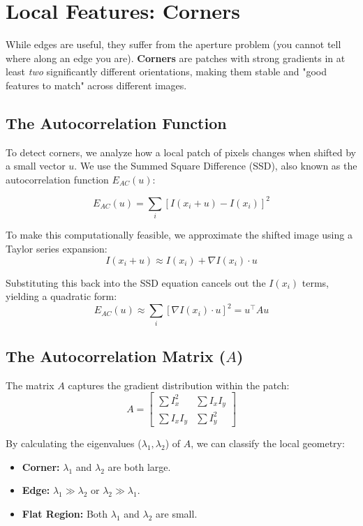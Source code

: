 \documentclass{report}
\begin{document}
\section{Local Features: Corners}
While edges are useful, they suffer from the aperture problem (you cannot tell where along an edge you are). \textbf{Corners} are patches with strong gradients in at least \textit{two} significantly different orientations, making them stable and "good features to match" across different images.

\subsection{The Autocorrelation Function}
To detect corners, we analyze how a local patch of pixels changes when shifted by a small vector $u$. We use the Summed Square Difference (SSD), also known as the autocorrelation function $E_{AC}(u)$:

\[ E_{AC}(u) = \sum_{i}[I(x_{i}+u)-I(x_{i})]^{2} \]

To make this computationally feasible, we approximate the shifted image using a Taylor series expansion:
\[ I(x_{i}+u) \approx I(x_{i}) + \nabla I(x_{i})\cdot u \]

Substituting this back into the SSD equation cancels out the $I(x_i)$ terms, yielding a quadratic form:
\[ E_{AC}(u) \approx \sum_{i}[\nabla I(x_{i})\cdot u]^{2} = u^{\top}Au \]

\subsection{The Autocorrelation Matrix ($A$)}
The matrix $A$ captures the gradient distribution within the patch:
\[ A = \begin{bmatrix} \sum I_x^2 & \sum I_x I_y \\ \sum I_x I_y & \sum I_y^2 \end{bmatrix} \]

By calculating the eigenvalues ($\lambda_1, \lambda_2$) of $A$, we can classify the local geometry:
\begin{itemize}
    \item \textbf{Corner:} $\lambda_1$ and $\lambda_2$ are both large.
    \item \textbf{Edge:} $\lambda_1 \gg \lambda_2$ or $\lambda_2 \gg \lambda_1$.
    \item \textbf{Flat Region:} Both $\lambda_1$ and $\lambda_2$ are small.
\end{itemize}
\end{document}
